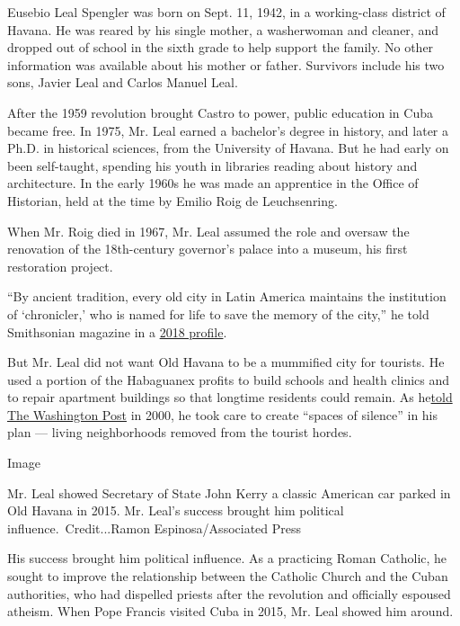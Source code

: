 Eusebio Leal Spengler was born on Sept. 11, 1942, in a working-class
district of Havana. He was reared by his single mother, a washerwoman
and cleaner, and dropped out of school in the sixth grade to help
support the family. No other information was available about his mother
or father. Survivors include his two sons, Javier Leal and Carlos Manuel
Leal.

After the 1959 revolution brought Castro to power, public education in
Cuba became free. In 1975, Mr. Leal earned a bachelor's degree in
history, and later a Ph.D. in historical sciences, from the University
of Havana. But he had early on been self-taught, spending his youth in
libraries reading about history and architecture. In the early 1960s he
was made an apprentice in the Office of Historian, held at the time by
Emilio Roig de Leuchsenring.

When Mr. Roig died in 1967, Mr. Leal assumed the role and oversaw the
renovation of the 18th-century governor's palace into a museum, his
first restoration project.

``By ancient tradition, every old city in Latin America maintains the
institution of `chronicler,' who is named for life to save the memory of
the city,'' he told Smithsonian magazine in a
\href{https://www.smithsonianmag.com/travel/man-who-saved-havana-180968735/?page=2}{2018
profile}.

But Mr. Leal did not want Old Havana to be a mummified city for
tourists. He used a portion of the Habaguanex profits to build schools
and health clinics and to repair apartment buildings so that longtime
residents could remain. As
he\href{https://www.washingtonpost.com/lifestyle/style/eusebio-leal-the-man-who-would-save-old-havana/2012/05/20/gIQAAW31dU_story.html}{told
The Washington Post} in 2000, he took care to create ``spaces of
silence'' in his plan --- living neighborhoods removed from the tourist
hordes.

Image

Mr. Leal showed Secretary of State John Kerry a classic American car
parked in Old Havana in 2015. Mr. Leal's success brought him political
influence.~Credit...Ramon Espinosa/Associated Press

His success brought him political influence. As a practicing Roman
Catholic, he sought to improve the relationship between the Catholic
Church and the Cuban authorities, who had dispelled priests after the
revolution and officially espoused atheism. When Pope Francis visited
Cuba in 2015, Mr. Leal showed him around.

